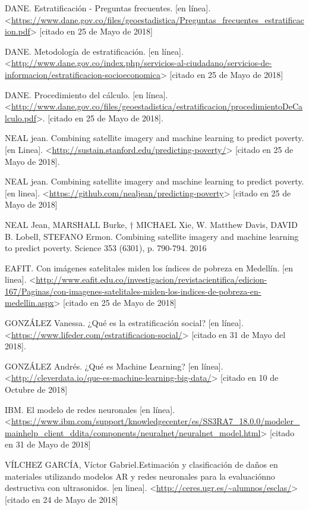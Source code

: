 DANE. Estratificación - Preguntas frecuentes. [en línea]. <\url{https://www.dane.gov.co/files/geoestadistica/Preguntas_frecuentes_estratificacion.pdf}> [citado en 25 de Mayo de 2018]
    
DANE. Metodología de estratificación. [en línea].
 <\url{http://www.dane.gov.co/index.php/servicios-al-ciudadano/servicios-de-informacion/estratificacion-socioeconomica}> [citado en 25 de Mayo de 2018]

DANE. Procedimiento del cálculo. [en línea].
 <\url{http://www.dane.gov.co/files/geoestadistica/estratificacion/procedimientoDeCalculo.pdf}>.
 [citado en 25 de Mayo de 2018].
 
NEAL jean. Combining satellite imagery and machine learning to predict poverty. [en Linea]. <\url{http://sustain.stanford.edu/predicting-poverty/}> [citado en 25 de Mayo de 2018].

NEAL jean. Combining satellite imagery and machine learning to predict poverty. [en linea]. <\url{https://github.com/nealjean/predicting-poverty}> [citado en 25 de Mayo de 2018]

NEAL Jean, MARSHALL Burke, † MICHAEL Xie, W. Matthew Davis, DAVID B. Lobell, STEFANO Ermon. Combining satellite imagery and machine learning to predict poverty. Science 353 (6301), p. 790-794. 2016

EAFIT. Con imágenes satelitales miden los índices de pobreza en Medellín. [en linea]. <\url{http://www.eafit.edu.co/investigacion/revistacientifica/edicion-167/Paginas/con-imagenes-satelitales-miden-los-indices-de-pobreza-en-medellin.aspx}> [citado en 25 de Mayo de 2018]

GONZÁLEZ Vanessa. ¿Qué es la estratificación social? [en línea]. <\url{https://www.lifeder.com/estratificacion-social/}> [citado en 31 de Mayo del 2018].

GONZÁLEZ  Andrés. ¿Qué es Machine Learning? [en línea]. <\url{http://cleverdata.io/que-es-machine-learning-big-data/}> [citado en 10 de Octubre de 2018]

IBM. El modelo de redes neuronales [en línea]. <\url{https://www.ibm.com/support/knowledgecenter/es/SS3RA7_18.0.0/modeler_mainhelp_client_ddita/components/neuralnet/neuralnet_model.html}> [citado en 31 de Mayo de 2018]

VÍLCHEZ GARCÍA, Víctor Gabriel.Estimación y clasificación de daños en materiales utilizando modelos AR y redes neuronales para la evaluaciónno destructiva con ultrasonidos. [en linea].  <\url{http://ceres.ugr.es/~alumnos/esclas/}> [citado en 24 de Mayo de 2018]

